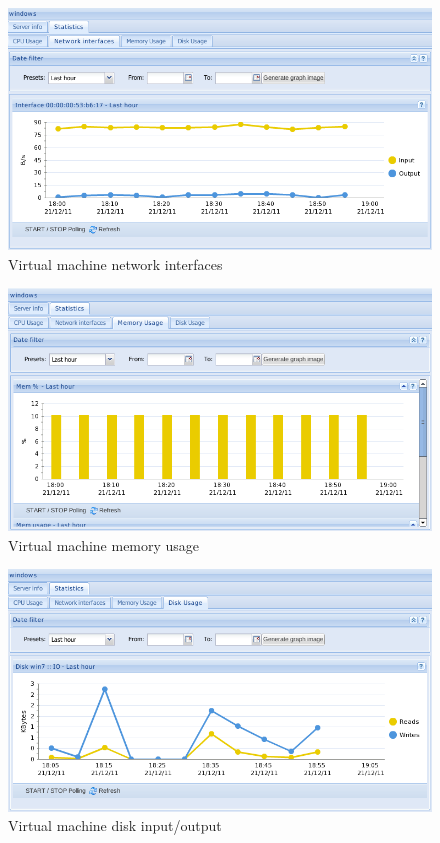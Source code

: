 \begin{figure}[H]
	\begin{center}
	\includegraphics[scale=0.45]{screenshots/vm_interfaces.png}
	\caption{Virtual machine network interfaces}
	\label{fig:vm_interfaces}
	\end{center}
\end{figure}

\begin{figure}[H]
	\begin{center}
	\includegraphics[scale=0.45]{screenshots/vm_mem.png}
	\caption{Virtual machine memory usage}
	\label{fig:vm_mem}
	\end{center}
\end{figure}

\begin{figure}[H]
	\begin{center}
	\includegraphics[scale=0.45]{screenshots/vm_disk_io.png}
	\caption{Virtual machine disk input/output}
	\label{fig:vm_disk_io}
	\end{center}
\end{figure}

